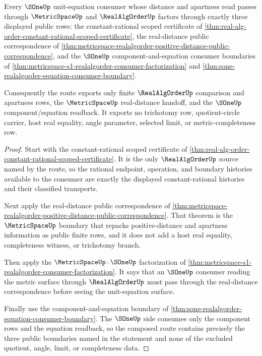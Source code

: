 \begin{theorem}
\label{thm:realalgorder-metric-sone-public-boundary}
Every $\SOneUp$ unit-equation consumer whose distance and apartness read passes through $\MetricSpaceUp$ and $\RealAlgOrderUp$ factors through exactly three displayed public rows: the constant-rational scoped certificate of \autoref{thm:real-alg-order-constant-rational-scoped-certificate}, the real-distance public correspondence of \autoref{thm:metricspace-realalgorder-positive-distance-public-correspondence}, and the $\SOneUp$ component-and-equation consumer boundaries of \autoref{thm:metricspace-s1-realalgorder-consumer-factorization} and \autoref{thm:sone-realalgorder-equation-consumer-boundary}.

Consequently the route exports only finite $\RealAlgOrderUp$ comparison and apartness rows, the $\MetricSpaceUp$ real-distance handoff, and the $\SOneUp$ component/equation readback. It exports no trichotomy row, quotient-circle carrier, host real equality, angle parameter, selected limit, or metric-completeness row.
\end{theorem}
\begin{proof}
Start with the constant-rational scoped certificate of \autoref{thm:real-alg-order-constant-rational-scoped-certificate}. It is the only $\RealAlgOrderUp$ source named by the route, so the rational endpoint, operation, and boundary histories available to the consumer are exactly the displayed constant-rational histories and their classified transports.

Next apply the real-distance public correspondence of \autoref{thm:metricspace-realalgorder-positive-distance-public-correspondence}. That theorem is the $\MetricSpaceUp$ boundary that repacks positive-distance and apartness information as public finite rows, and it does not add a host real equality, completeness witness, or trichotomy branch.

Then apply the $\MetricSpaceUp$--$\SOneUp$ factorization of \autoref{thm:metricspace-s1-realalgorder-consumer-factorization}. It says that an $\SOneUp$ consumer reading the metric surface through $\RealAlgOrderUp$ must pass through the real-distance correspondence before seeing the unit-equation surface.

Finally use the component-and-equation boundary of \autoref{thm:sone-realalgorder-equation-consumer-boundary}. The $\SOneUp$ side consumes only the component rows and the equation readback, so the composed route contains precisely the three public boundaries named in the statement and none of the excluded quotient, angle, limit, or completeness data.
\end{proof}

